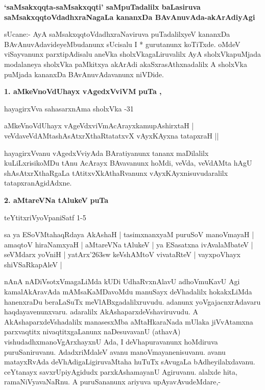 \begin{center}
{\large {\bf `saMsakxqqta-saMsakxqqti' saMpuTadalilx baLasiruva saMsakxqqtoVdadhxraNagaLa kananxDa BAvAnuvAda-akArAdiyAgi}}
\end{center}


sUcane:- AyA saMsakxqqtoVdadhxraNaviruva puTadalilxyeV kananxDa BAvAnuvAdavideyeMbudanunx sUcisalu I * gurutanunx koTiTxde. oMdeV viSayvanunx parxtipAdisalu aneVka sholxVkagaLiruvalilx AyA sholxVkapuMjada modalaneya sholxVka paMkitxya akArAdi akaSxrasAthxnadalilx A sholxVka puMjada kananxDa BAvAnuvAdavanunx niVDide.

\medskip
\noindent
\textbf{1. aMkeVnoVdUhayx vAgedxVviVM} \hfill{\bf puTa ,}

\hfill{hayagirxVva sahasarxnAma sholxVka -31}

\smallskip
\begin{shloka}
aMkeVnoVdUhayx vAgeVdxviVmAcArayxkamupAshirxtaH |\\
veVdaveVdAMtashAsAtxrXthaRtatatxvX	vAyxKAyxna tatapxraH ||
\end{shloka}

hayagirxVvanu vAgedxVviyAda BAratiyanunx tananx maDilalilx kuLiLxrisikoMDu tAnu AcArayx BAvavanunx hoMdi, veVda, veVdAMta hAgU shAsAtxrXthaRgaLa tAtitxvXkAthaRvanunx vAyxKAyxnisuvudaralilx tatapxranAgidAdxne.

\medskip
\noindent
\textbf{2. aMtareVNa tAlukeV} \hfill{\bf puTa }

\hfill{teYtitxriVyoVpaniSatf 1-5}

\smallskip
sa ya ESoVMtahaqRdaya AkAshaH | tasimxnanxyaM puruSoV manoVmayaH | amaqtoV hiraNamxyaH | aMtareVNa tAlukeV | ya ESasatxna ivAvalaMbateV | seVMdarx yoVniH | yatArx\char'263sw keVshAMtoV vivataRteV | vayxpoVhayx shiVSaRkapAleV |

nAnA nADiVsotxVmagaLiMda kUDi UdhaRvxnAlavU adhoVmuKavU Agi kamalAkAravAda mAMsaKaMDavoMdu manuSayx deVhadalilx hokakxLiMda hanenxraDu beraLaSuTx meVlABxgadalilxruvudu. adanunx yoVgajacnxrAdavaru haqdayavenunxvaru. adaralilx AkAshaparxdeVshaviruvudu. A AkAshaparxdeVshadalilx manasesxMba aMtaHkaraNada mUlaka jiVvAtamxna parxvaqtitx nivaqtitxgaLanunx naDesuvavanU (athavA) vishudadhxmanoVgArxhayxnU Ada, I deVhapuravanunx hoMdiruva puruSaniruvanu. AdadxriMdaleV avanu manoVmayanenisuvanu. avanu matayxRvAda deVhAdigaLigiruvaMtaha huTuTx sAvugaLa bAdheyilalxdavanu. ceYtanayx savxrUpiyAgidudx parxkAshamayanU Agiruvanu. alalxde hita, ramaNiVyavaNaRnu. A puruSananunx ariyuva upAyavAvudeMdare,-

